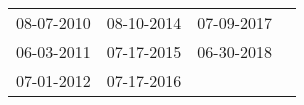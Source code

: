 \begin{supertabular}{llll}
 08-07-2010 &  08-10-2014 &  07-09-2017 \\
 06-03-2011 &  07-17-2015 &  06-30-2018 \\
 07-01-2012 &  07-17-2016 &             \\
\end{supertabular}
